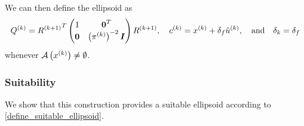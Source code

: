 \documentclass{article}
\begin{document}
We can then define the ellipsoid as
\begin{align}
\label{define_linear_nontrival_ellipsoid}
{Q^{(k)}} = {R^{(k+1)}}^T \begin{pmatrix}
1 & \boldsymbol0^T \\
\boldsymbol 0 & \left({\pi^{(k)}}\right)^{-2} \boldsymbol I \\
\end{pmatrix} {R^{(k+1)}},
\quad
c^{(k)} = x^{(k)}+\delta_{f} {{{\hat u}^{(k)}}},
\quad
\textrm{and}
\quad
\delta_k=\delta_{f}
\end{align}
whenever ${\mathcal A}\left(x^{(k)}\right) \ne \emptyset$.





\subsubsection{Suitability}

We show that this construction provides a suitable ellipsoid according to \cref{define_suitable_ellipsoid}.

\end{document}
